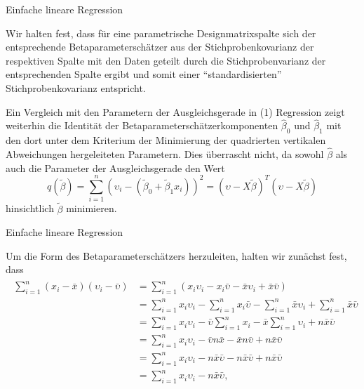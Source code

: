 \documentclass[
  8pt,
  ignorenonframetext,
]{beamer}
\begin{document}
\begin{frame}{Einfache lineare Regression}
\protect\hypertarget{einfache-lineare-regression-1}{}
\small

Wir halten fest, dass für eine parametrische Designmatrixspalte sich der
entsprechende Betaparameterschätzer aus der Stichprobenkovarianz der
respektiven Spalte mit den Daten geteilt durch die Stichprobenvarianz
der entsprechenden Spalte ergibt und somit einer ``standardisierten''
Stichprobenkovarianz entspricht. \vspace{2mm}

Ein Vergleich mit den Parametern der Ausgleichsgerade in (1) Regression
zeigt weiterhin die Identität der Betaparameterschätzerkomponenten
\(\hat{\beta}_0\) und \(\hat{\beta}_1\) mit den dort unter dem Kriterium
der Minimierung der quadrierten vertikalen Abweichungen hergeleiteten
Parametern. Dies überrascht nicht, da sowohl \(\hat{\beta}\) als auch
die Parameter der Ausgleichsgerade den Wert \begin{equation}
q(\tilde{\beta})
= \sum_{i=1}^n (\upsilon_i - (\tilde{\beta}_0 + \tilde{\beta}_1 x_i))^2
= (\upsilon -  X\tilde{\beta})^T(\upsilon -  X\tilde{\beta})
\end{equation} hinsichtlich \(\tilde{\beta}\) minimieren.
\end{frame}

\begin{frame}{Einfache lineare Regression}
\protect\hypertarget{einfache-lineare-regression-2}{}
\footnotesize

Um die Form des Betaparameterschätzers herzuleiten, halten wir zunächst
fest, dass \tiny \begin{align}
\begin{split}
\sum_{i=1}^n (x_i-\bar{x})(\upsilon_i-\bar{\upsilon})
& = \sum_{i=1}^n (x_i\upsilon_i - x_i\bar{\upsilon} - \bar{x}\upsilon_i + \bar{x}\bar{\upsilon}) \\
& = \sum_{i=1}^n x_i\upsilon_i
  - \sum_{i=1}^n x_i\bar{\upsilon}
  - \sum_{i=1}^n \bar{x}\upsilon_i
  + \sum_{i=1}^n \bar{x}\bar{\upsilon} \\
& = \sum_{i=1}^n x_i\upsilon_i
  - \bar{\upsilon} \sum_{i=1}^n x_i
  - \bar{x}\sum_{i=1}^n \upsilon_i
  + n \bar{x}\bar{\upsilon} \\
& = \sum_{i=1}^n x_i\upsilon_i
  - \bar{\upsilon}n\bar{x}
  - \bar{x}n\bar{\upsilon}
  + n\bar{x}\bar{\upsilon} \\
  & = \sum_{i=1}^n x_i\upsilon_i
  - n\bar{x}\bar{\upsilon}
  - n\bar{x}\bar{\upsilon}
  + n\bar{x}\bar{\upsilon} \\
& = \sum_{i=1}^n x_i \upsilon_i  - n \bar{x}\bar{\upsilon},
\end{split}
\end{align}
\end{frame}
\end{document}
